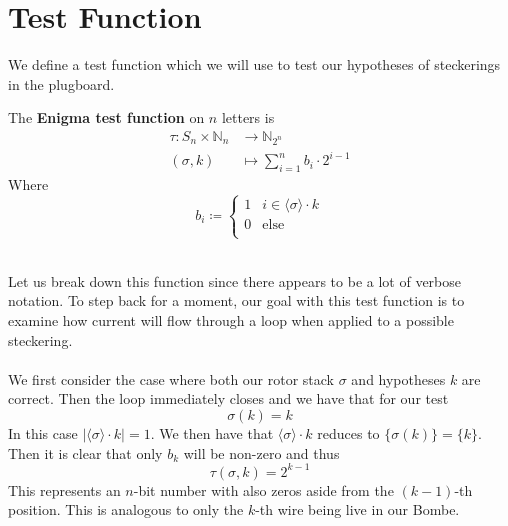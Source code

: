 \section{Test Function}




We define a test function which we will use to test our hypotheses of steckerings in the plugboard. 

\begin{definition}
    The \textbf{Enigma test function} on $n$ letters is 
    \begin{align*}
        \tau: S_n\times \mathbb{N}_n & \to \mathbb{N}_{2^n}
        \\(\sigma, k) &\mapsto \sum_{i=1}^{n}b_i\cdot 2^{i-1}
    \end{align*}
    Where
    \[
      b_i \coloneq 
      \begin{cases} 
      1 & i\in\langle\sigma\rangle\cdot{k}\\
      0 & \text{else} \\
      \end{cases}
    \]
\end{definition}
\text{}\\Let us break down this function since there appears to be a lot of verbose notation. To step back for a moment, our goal
with this test function is to examine how current will flow through a loop when applied to a possible steckering. 
\\\\We first consider the case where both our rotor stack $\sigma$ and hypotheses $k$ are correct. Then the loop immediately closes and 
we have that for our test
    \[
        \sigma(k) = k
    \]
In this case $\vert\langle\sigma\rangle\cdot{k}\vert = 1$. We then have that $\langle\sigma\rangle\cdot{k}$ reduces to $\{\sigma(k)\} = \{k\}$.
Then it is clear that only $b_k$ will be non-zero and thus
\[
    \tau(\sigma, k) = 2^{k-1}
\]
This represents an $n$-bit number with also zeros aside from the $(k-1)$-th position. This is analogous to only the $k$-th wire being live in our Bombe. 
